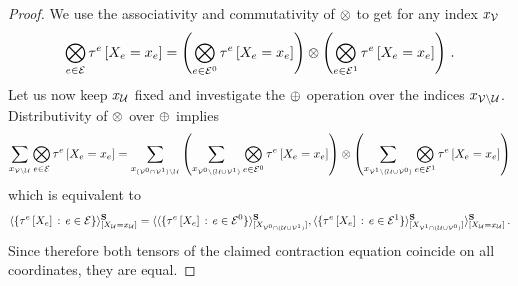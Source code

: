 \begin{proof}
    We use the associativity and commutativity of $\otimes$ to get for any index $x_{\mathcal{V}}$
    \begin{align*}
        \bigotimes_{e\in\mathcal{E}}\tau^{e}\left[X_{e}=x_{e}\right]
        = \left(\bigotimes_{e\in\mathcal{E}^{0}}\tau^{e}\left[X_{e}=x_{e}\right]\right)
        \otimes \left(\bigotimes_{e\in\mathcal{E}^{1}}\tau^{e}\left[X_{e}=x_{e}\right]\right) \, .
    \end{align*}
    Let us now keep $x_{\mathcal{U}}$ fixed and investigate the $\oplus$ operation over the indices $x_{\mathcal{V}\backslash\mathcal{U}}$.
    Distributivity of $\otimes$ over $\oplus$ implies
    \begin{align*}
        \sum_{x_{\mathcal{V}\backslash\mathcal{U}}} \bigotimes_{e\in\mathcal{E}}\tau^{e}\left[X_{e}=x_{e}\right]
        = \sum_{x_{(\mathcal{V}^{0}\cap\mathcal{V}^{1})\backslash \mathcal{U}}}
        \left(
            \sum_{x_{\mathcal{V}^{0}\backslash(\mathcal{U}\cup\mathcal{V}^{1})}}\bigotimes_{e\in\mathcal{E}^{0}}\tau^{e}\left[X_{e}=x_{e}\right]
        \right) \otimes
        \left(
            \sum_{x_{\mathcal{V}^{1}\backslash(\mathcal{U}\cup\mathcal{V}^{0})}}\bigotimes_{e\in\mathcal{E}^{1}}\tau^{e}\left[X_{e}=x_{e}\right]
        \right)
    \end{align*}
    which is equivalent to
    \begin{align*}
        \langle
            \left\{\tau^{e}\left[X_{e}\right]\,:\,e\in\mathcal{E}\right\}
        \rangle^{\mathbf{S}}_{[X_{\mathcal{U}}=x_{\mathcal{U}}]}
        =
        \langle
            \langle
                \{\tau^{e}\left[X_{e}\right] \,:\, e\in\mathcal{E}^{0}\}
            \rangle^{\mathbf{S}}_{[X_{\mathcal{V}^{0}\cap(\mathcal{U}\cup\mathcal{V}^{1})}]},
            \langle
                \{\tau^{e}\left[X_{e}\right] \,:\, e\in\mathcal{E}^{1}\}
            \rangle^{\mathbf{S}}_{[X_{\mathcal{V}^{1}\cap(\mathcal{U}\cup\mathcal{V}^{0})}]}
        \rangle^{\mathbf{S}}_{[X_{\mathcal{U}}=x_{\mathcal{U}}]} \, .
    \end{align*}
    Since therefore both tensors of the claimed contraction equation coincide on all coordinates, they are equal.
\end{proof}

